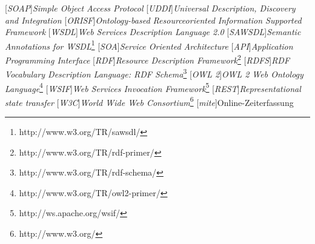 
[\emph{SOAP}]{\emph{Simple Object Access Protocol}}
[\emph{UDDI}]{\emph{Universal Description, Discovery and Integration}}
[\emph{ORISF}]{\emph{Ontology-based Resourceoriented Information Supported Framework}}
[\emph{WSDL}]{\emph{Web Services Description Language 2.0}}
[\emph{SAWSDL}]{\emph{Semantic Annotations for WSDL}\footnote{http://www.w3.org/TR/sawsdl/}}
[\emph{SOA}]{\emph{Service Oriented Architecture}}
[\emph{API}]{\emph{Application Programming Interface}}
[\emph{RDF}]{\emph{Resource Description Framework}\footnote{http://www.w3.org/TR/rdf-primer/}}
[\emph{RDFS}]{\emph{RDF Vocabulary Description Language: RDF Schema}\footnote{http://www.w3.org/TR/rdf-schema/}}
[\emph{OWL 2}]{\emph{OWL 2 Web Ontology Language}\footnote{http://www.w3.org/TR/owl2-primer/}}
[\emph{WSIF}]{\emph{Web Services Invocation Framework}\footnote{http://ws.apache.org/wsif/}}
[\emph{REST}]{\emph{Representational state transfer}}
[\emph{W3C}]{\emph{World Wide Web Consortium}\footnote{http://www.w3.org/}}
[\emph{mite}]{Online-Zeiterfassung}
